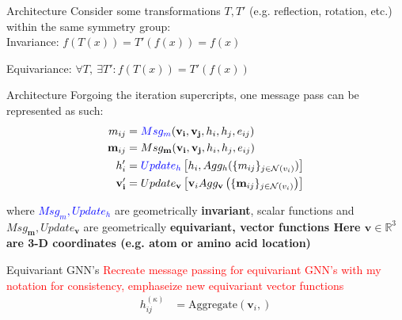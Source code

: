 \documentclass{beamer}
\newcommand{\nhood}{\mathcal{N}}
\newcommand{\node}{v}
\newcommand{\nrepresent}{h}
\newcommand{\edge}{e}
\newcommand{\iter}{\kappa}
\newcommand{\Agg}{\text{Aggregate}}
\begin{document}
\begin{frame}{Architecture}
Consider some transformations $T, T'$ (e.g. reflection, rotation, etc.) within the same symmetry group: \newline 
\vspace{3mm} 
\\ 

Invariance: $f(T(x)) = T'(f(x)) = f(x)$
\\
\vspace{6mm}

Equivariance: 
$\forall  T, \  \exists T': f(T(x)) = T'(f(x))$

\end{frame}

\begin{frame}{Architecture}
Forgoing the iteration supercripts, one message pass can be represented as such: 
    \begin{align*}
        m_{ij}
        &=
        \textcolor{blue}{Msg_m}(\mathbf{\node_i}, \mathbf{\node_j}, \nrepresent_i, \nrepresent_j, \edge_{ij}) 
    \\ 
        \mathbf{m}_{ij}
        &=
        Msg_{\mathbf{m}}
        (\mathbf{\node_i}, \mathbf{\node_j}, \nrepresent_i, \nrepresent_j, \edge_{ij})
    \\
        \nrepresent_i'
        &=
        \textcolor{blue}{Update_\nrepresent}
        \left[
            \nrepresent_i
            , 
            Agg_h
            (
                \{m_{ij}\}_{j \in \nhood(\node_i)}
            )
        \right]     
    \\
        \mathbf{\node_i'}
        &=
        Update_{\mathbf\node}
        \left[
            \mathbf{\node}_i
            Agg_\mathbf{\node}
            \left( 
                \{\mathbf{m}_{ij}\}_{j \in \nhood(\node_i)}
            \right)
        \right]
    \end{align*}

    where \textcolor{blue}{$Msg_m, Update_h$} are geometrically {\bf invariant}, scalar functions and $Msg_{\mathbf{m}}, Update_{\mathbf\node}$ are geometrically \bf{equivariant}, vector functions \newline 
    Here $\mathbf\node \in \mathbb{R}^3$ are 3-D coordinates (e.g. atom or amino acid location)
\end{frame}

\begin{frame}{Equivariant GNN's}
\textcolor{red}{Recreate message passing for equivariant GNN's with my notation for consistency, emphaseize new equivariant vector functions}
\begin{align*}
    h_{ij}^{(\iter)}
    &=
    \Agg(\mathbf{\node}_i, )
\end{align*}
\end{frame}
\end{document}
